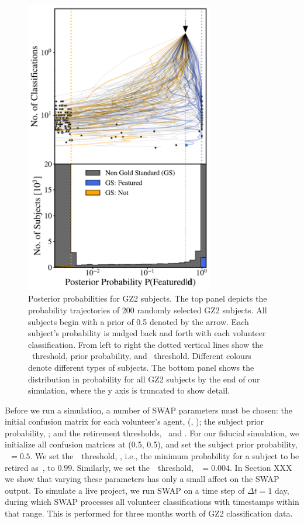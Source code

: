 \begin{figure} 
\centering
\includegraphics[width=3.25in]{Figures/human_machine/f3.pdf}
\caption[Galaxy posterior probabitilies realized through SWAP reprocessing of GZ2 data.]{Posterior probabilities for GZ2 subjects.  The top panel depicts the probability trajectories of 200 randomly selected GZ2 subjects. All subjects begin with a prior of 0.5 denoted by the arrow. Each subject's probability is nudged back and forth with each volunteer classification. From left to right the dotted vertical lines show the \notfeat~threshold, prior probability, and \feat~threshold. Different colours denote different types of subjects. The bottom panel shows the distribution in probability for all GZ2 subjects by the end of our simulation, where the y axis is truncated to show detail.}
\label{fig: subject probabilities}
\end{figure}


Before we run a simulation, a number of SWAP parameters must be chosen: the initial confusion matrix for each volunteer's agent, (\Pf, \Pn); the subject prior probability, \p; and the retirement thresholds, \tf~and \tn. For our fiducial  simulation, we initialize all confusion matrices at (0.5, 0.5), and set the subject prior probability, \p~$= 0.5$. We set the~\feat~threshold, \tf, i.e., the minimum probability for a subject to be retired as~\feat, to $0.99$. Similarly, we set the~\notfeat~threshold, \tn~$= 0.004$. In Section XXX we show that varying these parameters has only a small affect on the SWAP output. To simulate a live project, we run SWAP on a time step of $\Delta t = 1$ day, during which SWAP processes all volunteer classifications with timestamps within that range. This is performed for three months worth of GZ2 classification data. 

